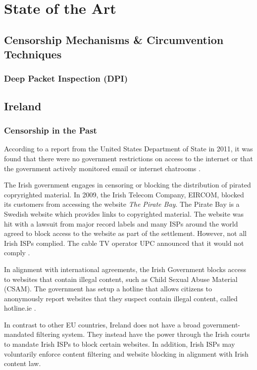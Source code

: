 \chapter{State of the Art}
\section{Censorship Mechanisms \& Circumvention Techniques}

\subsection{Deep Packet Inspection (DPI)}

\section{Ireland}

\subsection{Censorship in the Past}

According to a report from the United States Department of State in 2011, it was found that there were no government restrictions on access to the internet or that the government actively monitored email or internet chatrooms \cite{stateTechnicalDifficulties}.

The Irish government engages in censoring or blocking the distribution of pirated copryrighted material. In 2009, the Irish Telecom Company, EIRCOM, blocked its customers from accessing the website \textit{The Pirate Bay}. The Pirate Bay is a Swedish website which provides links to copyrighted material. The website was hit with a lawsuit from major record labels and many ISPs around the world agreed to block access to the website as part of the settlement. However, not all Irish ISPs complied. The cable TV operator UPC announced that it would not comply \cite{irishtimesEircomBlock}. 

In alignment with international agreements, the Irish Government blocks access to websites that contain illegal content, such as Child Sexual Abuse Material (CSAM). The government has setup a hotline that allows citizens to anonymously report websites that they suspect contain illegal content, called hotline.ie \cite{hotlineAboutx2013}.

In contrast to other EU countries, Ireland does not have a broad government-mandated filtering system. They instead have the power through the Irish courts to mandate Irish ISPs to block certain websites. In addition, Irish ISPs may voluntarily enforce content filtering and website blocking in alignment with Irish content law.

